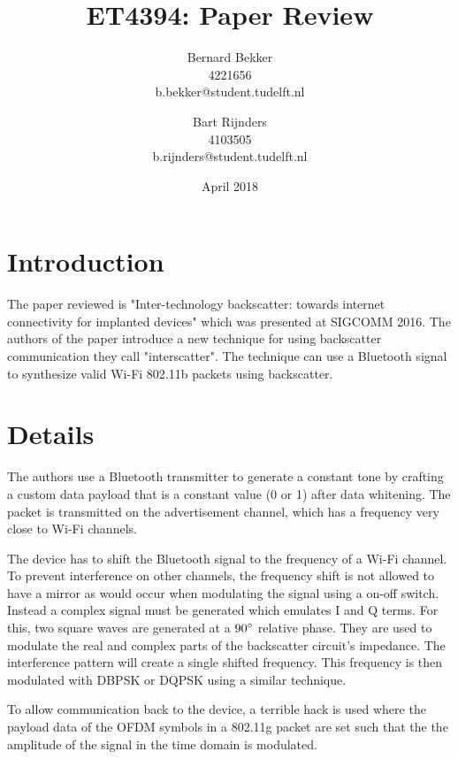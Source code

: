 \documentclass{article}
\title{ET4394: Paper Review}
\author{Bernard Bekker \\ 4221656 \\ b.bekker@student.tudelft.nl \and Bart Rijnders \\ 4103505 \\ b.rijnders@student.tudelft.nl}
\date{April 2018}
\begin{document}
\maketitle

\section{Introduction}
The paper reviewed is "Inter-technology backscatter: towards internet connectivity for implanted devices" \cite{iyer2016inter} which was presented at SIGCOMM 2016.
The authors of the paper introduce a new technique for using backscatter communication they call "interscatter". The technique can use a Bluetooth signal to synthesize valid Wi-Fi 802.11b packets using backscatter.%
\section{Details}
The authors use a Bluetooth transmitter to generate a constant tone by crafting a custom data payload that is a constant value (0 or 1) after data whitening. The packet is transmitted on the advertisement channel, which has a frequency very close to Wi-Fi channels.

The device has to shift the Bluetooth signal to the frequency of a Wi-Fi channel. To prevent interference on other channels, the frequency shift is not allowed to have a mirror as would occur when modulating the signal using a on-off switch. Instead a complex signal must be generated which emulates I and Q terms. For this, two square waves are generated at a $90 \degree$ relative phase. They are used to modulate the real and complex parts of the backscatter circuit's impedance. The interference pattern will create a single shifted frequency. This frequency is then modulated with DBPSK or DQPSK using a similar technique.

To allow communication back to the device, a terrible hack is used where the payload data of the OFDM symbols in a 802.11g packet are set such that the the amplitude of the signal in the time domain is modulated.
\end{document}
